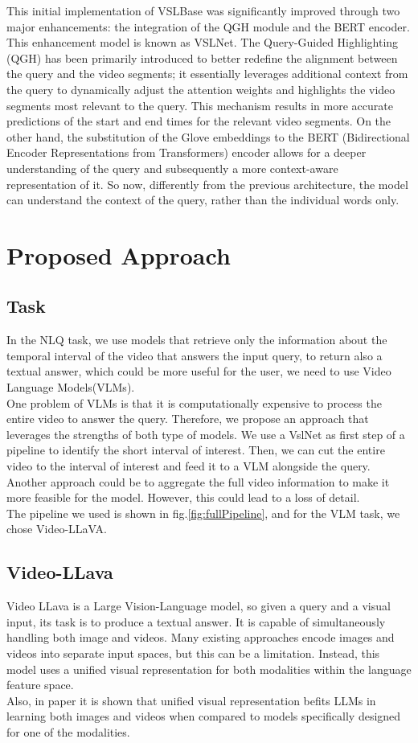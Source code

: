 \documentclass[conference]{IEEEtran}
\begin{document}
This initial implementation of VSLBase was significantly improved through two major enhancements: the integration of the QGH module and the BERT encoder. This enhancement model is known as VSLNet.
The Query-Guided Highlighting (QGH)  has been primarily introduced to better redefine the alignment between the query and the video segments; it essentially leverages additional context from the query to dynamically adjust the attention weights and highlights the video segments most relevant to the query. This mechanism results in more accurate predictions of the start and end times for the relevant video segments. On the other hand, the substitution of the Glove embeddings to the BERT (Bidirectional Encoder Representations from Transformers) encoder allows for a deeper understanding of the query and subsequently a more context-aware representation of it. So now, differently from the previous architecture, the model can understand the context of the query, rather than the individual words only.


\section{Proposed Approach}
\subsection{Task}
In the NLQ task, we use models that retrieve only the
information about the temporal interval of the video that
answers the input query, to return also a textual answer,
which could be more useful for the user, we need to use
Video Language Models(VLMs).\\
One problem of VLMs is that it is computationally expensive to process the entire video to answer the query. Therefore, we propose an approach that leverages the strengths of both type of models. We use a VslNet as first step of a pipeline to identify the short interval of interest. Then, we can cut the entire video to the interval of interest and feed it to a VLM alongside the query.
Another approach could be to aggregate the full video information to make it more feasible for the model. However, this could lead to a loss of detail.\\

The pipeline we used is shown in fig.\ref{fig:fullPipeline}, and for the VLM task, we chose Video-LLaVA.

\subsection{Video-LLava}
Video LLava is a Large Vision-Language model, so given a query and a visual input, its task is to produce a textual answer.  It is capable of simultaneously handling both image and videos. Many existing approaches encode images and videos into separate input spaces, but this can be a limitation. Instead, this model uses a unified visual representation for both modalities within the language feature space.\\
Also, in paper \cite{b8} it is shown that unified visual representation befits LLMs in learning both images and videos when compared to models specifically designed for one of the modalities.
\end{document}
